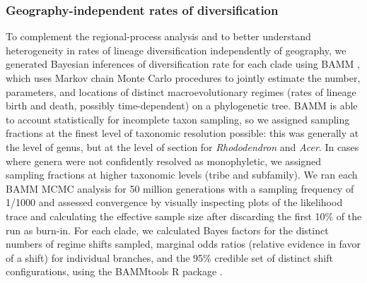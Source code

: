 \subsubsection{Geography-independent rates of diversification}

To complement the regional-process analysis and to better understand heterogeneity in rates of lineage diversification independently of geography, we generated Bayesian inferences of diversification rate for each clade using BAMM \citep{Rabosky2014}, which uses Markov chain Monte Carlo procedures to jointly estimate the number, parameters, and locations of distinct macroevolutionary regimes (rates of lineage birth and death, possibly time-dependent) on a phylogenetic tree. BAMM is able to account statistically for incomplete taxon sampling, so we assigned sampling fractions at the finest level of taxonomic resolution possible: this was generally at the level of genus, but at the level of section for \textit{Rhododendron} and \textit{Acer}. In cases where genera were not confidently resolved as monophyletic, we assigned sampling fractions at higher taxonomic levels (tribe and subfamily). We ran each BAMM MCMC analysis for 50 million generations with a sampling frequency of 1/1000 and assessed convergence by visually inspecting plots of the likelihood trace and calculating the effective sample size after discarding the first 10\% of the run as burn-in. For each clade, we calculated Bayes factors for the distinct numbers of regime shifts sampled, marginal odds ratios (relative evidence in favor of a shift) for individual branches, and the 95\% credible set of distinct shift configurations, using the BAMMtools R package \citep{Rabosky2014}.

